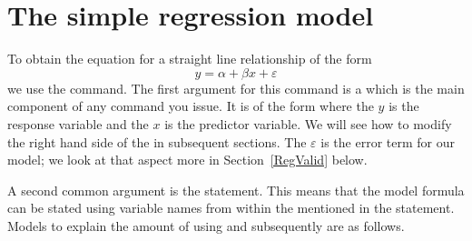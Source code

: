  
 
\section{The simple regression model} 
 
To obtain the equation for a straight line relationship of the form \begin{equation} 
y=\alpha+\beta{}x +\varepsilon 
\end{equation} we use the  command. The first argument for this command is a  which is the main component of any  command you issue. It is of the form  where the $y$ is the response variable and the $x$ is the predictor variable. We will see how to modify the right hand side of the  in subsequent sections. The $\varepsilon$ is the error term for our model; we look at that aspect more in Section~\ref{RegValid}    below.  



A second common argument is the  statement. This means that the model formula can be stated using variable names from within the  mentioned in the  statement. Models to explain the amount of  using  and subsequently  are as follows. 

